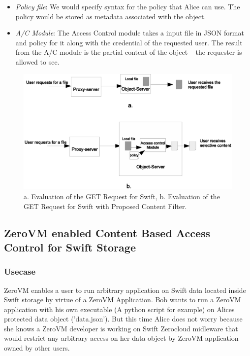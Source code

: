 \begin{appendices}
\begin{itemize}
\item \emph{Policy file}: We would specify syntax for the policy that Alice can use. The policy would be stored as metadata associated with the object.
\item \emph{A/C Module}: The Access Control module takes a input file in JSON format and  policy for it along with the credential of the requested user. The result from the A/C module is the partial content of the object – the requester is allowed to see.

\end{itemize}

\begin{figure}[t]
\centering
\includegraphics {eps/swift-content-filter}
\caption{a. Evaluation of the GET Request for Swift, b.   Evaluation of the GET Request for  Swift with Proposed Content Filter.}
\label{fig:swift-content-filter}
\end{figure}

\subsection{ ZeroVM enabled Content Based Access Control for Swift Storage} 

\subsubsection{ Usecase}
ZeroVM enables a user to run arbitrary application on Swift data located inside Swift storage by virtue of a ZeroVM Application. Bob wants to run a ZeroVM application with his own executable (A python script for example) on Alices  protected data object ('data.json'). But this time Alice does not worry because she knows a ZeroVM developer is working on Swift Zerocloud midleware that would restrict any arbitrary access on her data object by ZeroVM application owned by other users.


\end{appendices}
